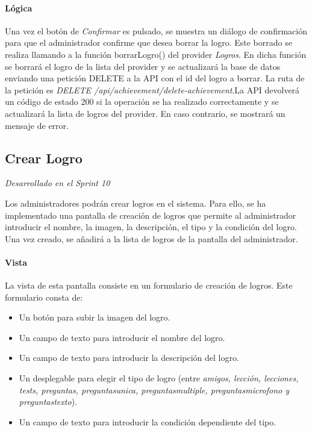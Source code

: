\paragraph*{Lógica}
Una vez el botón de \textit{Confirmar} es pulsado, se muestra un diálogo de confirmación para que el administrador confirme que desea borrar la logro.
Este borrado se realiza llamando a la función borrarLogro() del provider \textit{Logros}. En dicha función se borrará el logro de la lista del provider y se actualizará la base de datos enviando
una petición DELETE a la API con el id del logro a borrar. La ruta de la petición es \textit{DELETE /api/achievement/delete-achievement}.La API devolverá un código de estado 200 si la operación se ha realizado correctamente y se actualizará la lista de logros del provider. En caso contrario, se mostrará un mensaje de error.



\subsection{Crear Logro} 

\textit{Desarrollado en el Sprint 10}

Los administradores podrán crear logros en el sistema. Para ello, se ha implementado una pantalla de creación de logros que permite al administrador introducir el nombre, la imagen, la descripción, el tipo y la condición del logro. Una vez creado, se añadirá a la lista de logros de la pantalla del administrador.


\paragraph*{Vista}
La vista de esta pantalla consiste en un formulario de creación de logros. Este formulario consta de:
\begin{itemize}
  \item Un botón para subir la imagen del logro.
  \item Un campo de texto para introducir el nombre del logro.
  \item Un campo de texto para introducir la descripción del logro.
  \item Un desplegable para elegir el tipo de logro (entre \textit{amigos, lección, lecciones, tests, preguntas, preguntasunica, preguntasmultiple, preguntasmicrofono y preguntastexto}).  
  \item Un campo de texto para introducir la condición dependiente del tipo.
\end{itemize}

